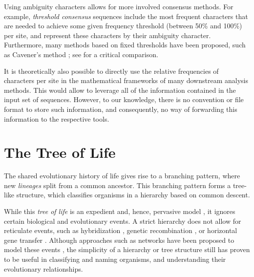 Using ambiguity characters allows for more involved consensus methods.
For example, \emph{threshold consensus} sequences \citep{Day1992a,Day1992} include the most frequent characters
that are needed to achieve some given frequency threshold (between \num{50}\% and \num{100}\%) per site,
and represent these characters by their ambiguity character.
Furthermore, many methods based on fixed thresholds have been proposed,
such as Cavener's method \citep{Cavener1987,Cavener1991a};
see \cite{Day1992a} for a critical comparison.

It is theoretically also possible to directly use the relative frequencies of characters per site
in the mathematical frameworks of many downstream analysis methods.
This would allow to leverage all of the information contained in the input set of sequences.
However, to our knowledge, there is no convention or file format to store such information,
and consequently, no way of forwarding this information to the respective tools.


\section{The Tree of Life}
\label{ch:Foundations:sec:TreeOfLife}

The shared evolutionary history of life gives rise to a branching pattern,
where new \emph{lineages} split from a common ancestor.
This branching pattern forms a tree-like structure,
which classifies organisms in a hierarchy based on common descent.

While this \emph{tree of life} is an expedient and, hence, pervasive model \cite{Mindell2013},
it ignores certain biological and evolutionary events.
A strict hierarchy does not allow for reticulate events,
such as hybridization \cite{Maddison1997a}, genetic recombination \cite{Hein1993},
or horizontal gene transfer \cite{Ochman2000,DunningHotopp2011,Robinson2013}.
Although approaches such as networks have been proposed to model these events \cite{Huson2011a},
the simplicity of a hierarchy or tree structure still has proven
to be useful in classifying and naming organisms, and understanding their evolutionary relationships.


